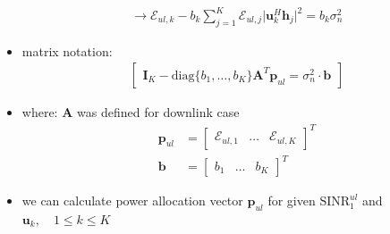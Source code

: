 \documentclass[a4paper, 10pt]{article}
\begin{document}
\begin{itemize}
\begin{align*}
	\end{align*}
	\begin{align*}
		\rightarrow \mathcal{E}_{ul,k} - b_k\sum\limits_{j = 1}^{K}\mathcal{E}_{ul,j}\bigl|\mathbf{u}_k^H\mathbf{h}_j\bigr|^2 = b_k\sigma_n^2
	\end{align*}
	\item matrix notation:
	\begin{align*}
		\begin{bmatrix}
			\mathbf{I}_K - \text{diag}\bigl\{b_1,\ldots, b_K\bigr\}\mathbf{A}^T\mathbf{p}_{ul} = \sigma_n^2\cdot \mathbf{b}
		\end{bmatrix}
	\end{align*}
	\item where: $\mathbf{A} $ was defined for downlink case
	\begin{align*}
		\mathbf{p}_{ul} &= \begin{bmatrix} \mathcal{E}_{ul,1} & \ldots & \mathcal{E}_{ul,K}\end{bmatrix}^T \\
		\mathbf{b} &= \begin{bmatrix}b_1 & \ldots & b_K\end{bmatrix}^T				
	\end{align*}
	\item we can calculate power allocation vector $\mathbf{p}_{ul} $ for given $\text{SINR}_1^{ul} $ and $ \mathbf{u}_k,\quad 1\leq k \leq K $ 
\end{itemize} 
\end{document}
